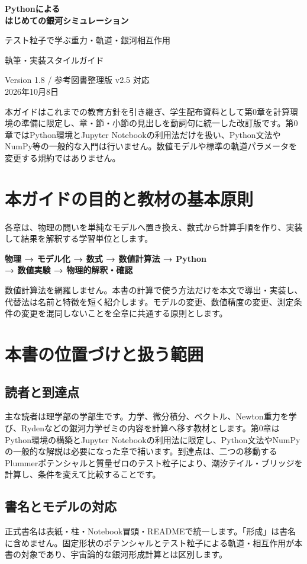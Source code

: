 \documentclass[10pt,openany]{book}
\begin{document}
\begin{center}
{\Large\sffamily\bfseries\color{navy} Pythonによる\\はじめての銀河シミュレーション}\par\medskip
{\large テスト粒子で学ぶ重力・軌道・銀河相互作用}\par\bigskip
{\Large\sffamily 執筆・実装スタイルガイド}\par\medskip
Version 1.8 / 参考図書整理版 v2.5 対応\\2026年10月8日
\end{center}
\medskip
本ガイドはこれまでの教育方針を引き継ぎ、学生配布資料として第0章を計算環境の準備に限定し、章・節・小節の見出しを動詞句に統一した改訂版です。第0章ではPython環境とJupyter Notebookの利用法だけを扱い、Python文法やNumPy等の一般的な入門は行いません。数値モデルや標準の軌道パラメータを変更する規約ではありません。

\section{本ガイドの目的と教材の基本原則}
各章は、物理の問いを単純なモデルへ置き換え、数式から計算手順を作り、実装して結果を解釈する学習単位とします。
\begin{center}\small\bfseries
物理 → モデル化 → 数式 → 数値計算法 → Python\\→ 数値実験 → 物理的解釈・確認
\end{center}
数値計算法を網羅しません。本書の計算で使う方法だけを本文で導出・実装し、代替法は名前と特徴を短く紹介します。モデルの変更、数値精度の変更、測定条件の変更を混同しないことを全章に共通する原則とします。

\section{本書の位置づけと扱う範囲}
\subsection{読者と到達点}
主な読者は理学部の学部生です。力学、微分積分、ベクトル、Newton重力を学び、Rydenなどの銀河力学ゼミの内容を計算へ移す教材とします。第0章はPython環境の構築とJupyter Notebookの利用法に限定し、Python文法やNumPyの一般的な解説は必要になった章で補います。到達点は、二つの移動するPlummerポテンシャルと質量ゼロのテスト粒子により、潮汐テイル・ブリッジを計算し、条件を変えて比較することです。
\subsection{書名とモデルの対応}
正式書名は表紙・柱・Notebook冒頭・READMEで統一します。「形成」は書名に含めません。固定形状のポテンシャルとテスト粒子による軌道・相互作用が本書の対象であり、宇宙論的な銀河形成計算とは区別します。
\end{document}
